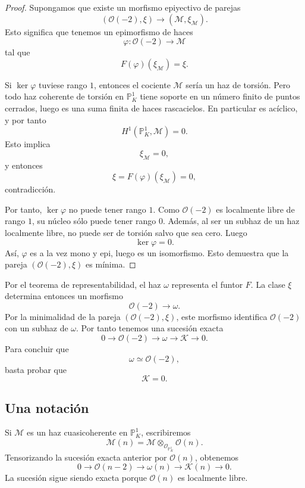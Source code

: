 \begin{proof}
Supongamos que existe un morfismo epiyectivo de parejas
\[
(\mathcal{O}(-2),\xi)\longrightarrow (\mathcal{M},\xi_{\mathcal{M}}).
\]
Esto significa que tenemos un epimorfismo de haces
\[
\varphi:\mathcal{O}(-2)\longrightarrow \mathcal{M}
\]
tal que
\[
F(\varphi)(\xi_{\mathcal{M}})=\xi.
\]

Si $\ker\varphi$ tuviese rango $1$, entonces el cociente $\mathcal{M}$ sería un haz de torsión. Pero todo haz coherente de torsión en $\mathbb{P}^1_K$ tiene soporte en un número finito de puntos cerrados, luego es una suma finita de haces rascacielos. En particular es acíclico, y por tanto
\[
H^1(\mathbb{P}^1_K,\mathcal{M})=0.
\]
Esto implica
\[
\xi_{\mathcal{M}}=0,
\]
y entonces
\[
\xi=F(\varphi)(\xi_{\mathcal{M}})=0,
\]
contradicción.

Por tanto, $\ker\varphi$ no puede tener rango $1$. Como $\mathcal{O}(-2)$ es localmente libre de rango $1$, su núcleo sólo puede tener rango $0$. Además, al ser un subhaz de un haz localmente libre, no puede ser de torsión salvo que sea cero. Luego
\[
\ker\varphi=0.
\]
Así, $\varphi$ es a la vez mono y epi, luego es un isomorfismo. Esto demuestra que la pareja $(\mathcal{O}(-2),\xi)$ es mínima.
\end{proof}

Por el teorema de representabilidad, el haz $\omega$ representa el funtor $F$. La clase $\xi$ determina entonces un morfismo
\[
\mathcal{O}(-2)\longrightarrow \omega.
\]
Por la minimalidad de la pareja $(\mathcal{O}(-2),\xi)$, este morfismo identifica $\mathcal{O}(-2)$ con un subhaz de $\omega$. Por tanto tenemos una sucesión exacta
\[
0\longrightarrow \mathcal{O}(-2)
\longrightarrow \omega
\longrightarrow \mathcal{K}
\longrightarrow 0.
\]
Para concluir que
\[
\omega\simeq \mathcal{O}(-2),
\]
basta probar que
\[
\mathcal{K}=0.
\]

\subsection*{Una notación}

Si $\mathcal{M}$ es un haz cuasicoherente en $\mathbb{P}^1_K$, escribiremos
\[
\mathcal{M}(n)
=
\mathcal{M}\otimes_{\mathcal{O}_{\mathbb{P}^1_K}}\mathcal{O}(n).
\]
Tensorizando la sucesión exacta anterior por $\mathcal{O}(n)$, obtenemos
\[
0\longrightarrow \mathcal{O}(n-2)
\longrightarrow \omega(n)
\longrightarrow \mathcal{K}(n)
\longrightarrow 0.
\]
La sucesión sigue siendo exacta porque $\mathcal{O}(n)$ es localmente libre.


